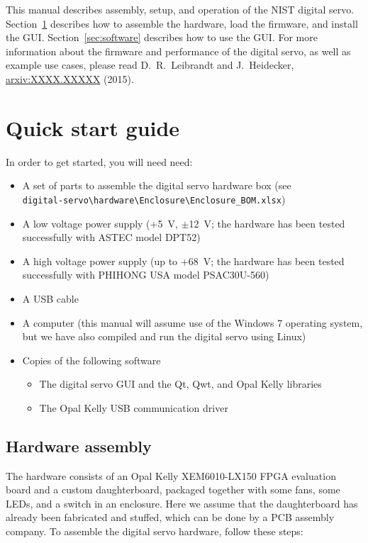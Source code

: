 \documentclass[aip,rsi,preprint,graphicx]{revtex4-1}
\begin{document}
This manual describes assembly, setup, and operation of the NIST digital servo.  Section~\ref{sec:quickStart} describes how to assemble the hardware, load the firmware, and install the GUI.  Section~\ref{sec:software} describes how to use the GUI.  For more information about the firmware and performance of the digital servo, as well as example use cases, please read D.~R.~Leibrandt and J.~Heidecker, \href{http://arxiv.org}{arxiv:XXXX.XXXXX} (2015).

\section{Quick start guide}\label{sec:quickStart}

In order to get started, you will need need:
\begin{itemize}
\item A set of parts to assemble the digital servo hardware box (see \\{\tt digital-servo\textbackslash hardware\textbackslash Enclosure\textbackslash Enclosure\_BOM.xlsx})
\item A low voltage power supply (+5~V, $\pm$12~V; the hardware has been tested successfully with ASTEC model DPT52)
\item A high voltage power supply (up to +68~V; the hardware has been tested successfully with PHIHONG USA model PSAC30U-560)
\item A USB cable
\item A computer (this manual will assume use of the Windows 7 operating system, but we have also compiled and run the digital servo using Linux)
\item Copies of the following software
\begin{itemize}
\item The digital servo GUI and the Qt, Qwt, and Opal Kelly libraries
\item The Opal Kelly USB communication driver
\end{itemize}
\end{itemize}

\subsection{Hardware assembly}

The hardware consists of an Opal Kelly XEM6010-LX150 FPGA evaluation board and a custom daughterboard, packaged together with some fans, some LEDs, and a switch in an enclosure.  Here we assume that the daughterboard has already been fabricated and stuffed, which can be done by a PCB assembly company.  To assemble the digital servo hardware, follow these steps:
\end{document}
